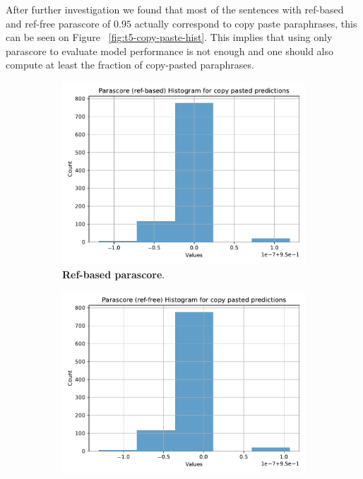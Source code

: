 \documentclass[fleqn,moreauthors,10pt]{ds_report}
\begin{document}
After further investigation we found that most of the sentences with ref-based and ref-free parascore of $0.95$ actually correspond to copy paste paraphrases, this can be seen on Figure ~\ref{fig:t5-copy-paste-hist}. This implies that using only parascore to evaluate model performance is not enough and one should also compute at least the fraction of copy-pasted paraphrases.

\begin{figure}[ht]
    \centering
    \begin{subfigure}{0.45\linewidth} %
        \centering
        \includegraphics[width=\textwidth]{t5-base-copy-preds-parascore-ref-based-hist.pdf}
        \caption{\textbf{Ref-based parascore}.}
        \label{fig:t5-aug-parascore-ref-based-hist}
    \end{subfigure}
    \hfill %
    \begin{subfigure}{0.45\linewidth} %
        \centering
        \includegraphics[width=\textwidth]{t5-base-copy-preds-parascore-ref-free-hist.pdf}

\end{subfigure}
\end{figure}
\end{document}
